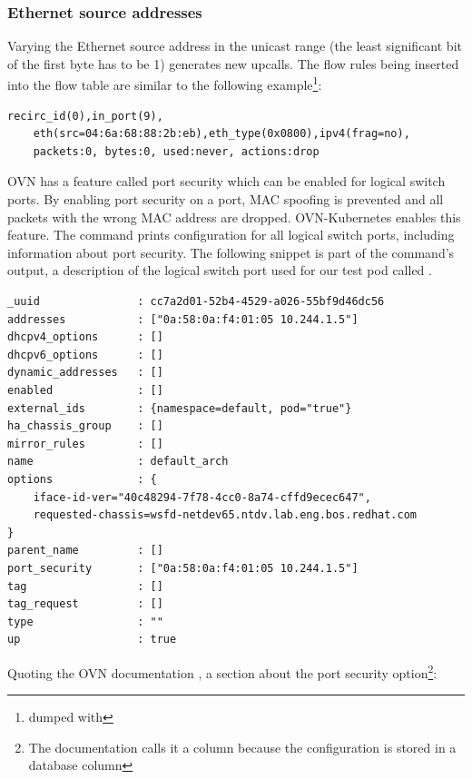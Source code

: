 \subsubsection{Ethernet source addresses}
\label{subsec:ethernet}

Varying the Ethernet source address in the unicast range (the least significant bit of the first byte has to be 1) generates new upcalls. The flow rules being inserted into the flow table are similar to the following example\footnote{dumped with }:

\begin{verbatim}
recirc_id(0),in_port(9),
    eth(src=04:6a:68:88:2b:eb),eth_type(0x0800),ipv4(frag=no),
    packets:0, bytes:0, used:never, actions:drop
\end{verbatim}

OVN has a feature called port security which can be enabled for logical switch ports. By enabling port security on a port, MAC spoofing is prevented and all packets with the wrong MAC address are dropped. OVN-Kubernetes enables this feature. The command  prints configuration for all logical switch ports, including information about port security. The following snippet is part of the command's output, a description of the logical switch port used for our test pod called .

\pagebreak
\begin{verbatim}
_uuid               : cc7a2d01-52b4-4529-a026-55bf9d46dc56
addresses           : ["0a:58:0a:f4:01:05 10.244.1.5"]
dhcpv4_options      : []
dhcpv6_options      : []
dynamic_addresses   : []
enabled             : []
external_ids        : {namespace=default, pod="true"}
ha_chassis_group    : []
mirror_rules        : []
name                : default_arch
options             : {
    iface-id-ver="40c48294-7f78-4cc0-8a74-cffd9ecec647",
    requested-chassis=wsfd-netdev65.ntdv.lab.eng.bos.redhat.com
}
parent_name         : []
port_security       : ["0a:58:0a:f4:01:05 10.244.1.5"]
tag                 : []
tag_request         : []
type                : ""
up                  : true
\end{verbatim}

Quoting the OVN documentation \cite{OVNNBMan}, a section about the port security option\footnote{The documentation calls it a column because the configuration is stored in a database column}:

